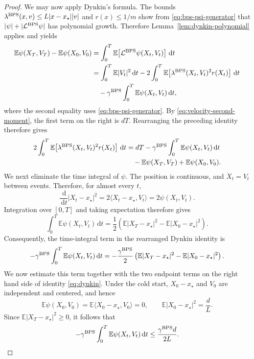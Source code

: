 \documentclass{amsart}
\theoremstyle{plain}
\theoremstyle{definition}
\theoremstyle{remark}
\newcommand{\ud}{\,\mathrm{d}}
\newcommand{\EE}{\mathbb{E}}
\newcommand{\abs}[1]{\lvert#1\rvert}
\newcommand{\E}{\EE}
\newcommand{\1}{\mathbf 1}
\newcommand{\dd}{\ud}
\newcommand{\ip}[2]{\langle #1,#2\rangle}
\newcommand{\bps}{{\rm BPS}}
\begin{document}
\begin{proof}
We may now apply Dynkin's formula.  The bounds
$\lambda^{\bps}(x,v)\le L\abs{x-x_\star}\abs v$ and
$r(x)\le1/m$ show from \eqref{eq:bps-psi-generator} that
$\abs\psi+\abs{\mathcal L^{\bps}\psi}$ has polynomial growth.  Therefore
Lemma~\ref{lem:dynkin-polynomial} applies and yields
\[
\begin{aligned}
        \E\psi(X_T,V_T)-\E\psi(X_0,V_0)
        & =\int_0^T
          \E\!\left[\mathcal L^{\bps}\psi(X_t,V_t)\right]\dd t \\
        &=\int_0^T\E\abs{V_t}^2\dd t
          -2\int_0^T\E\!\left[
            \lambda^{\bps}(X_t,V_t)^2r(X_t)
          \right]\dd t\\
        &\quad-\gamma^{\bps}
          \int_0^T\E\psi(X_t,V_t)\dd t,
\end{aligned}
\]
where the second equality uses  \eqref{eq:bps-psi-generator}.
By \eqref{eq:velocity-second-moment}, the first term on the right is $dT$.
Rearranging the preceding identity therefore gives
\begin{equation}\label{eq:dynkin}
\begin{aligned}
        2\int_0^T\E\!\left[
          \lambda^{\bps}(X_t,V_t)^2r(X_t)
        \right]\dd t
        &=dT-\gamma^{\bps}\int_0^T\E\psi(X_t,V_t)\dd t\\
        &\quad-\E\psi(X_T,V_T)+\E\psi(X_0,V_0).
\end{aligned}
\end{equation}
We next eliminate the time integral of $\psi$.  The position is continuous,
and $\dot X_t=V_t$ between events.  Therefore, for almost every $t$,
\[
        \frac{\dd}{\dd t}\abs{X_t-x_\star}^2
        =2\ip{X_t-x_\star}{V_t}
        =2\psi(X_t,V_t).
\]
Integration over $[0,T]$ and taking expectation therefore gives 
\[
        \int_0^T\E\psi(X_t,V_t)\dd t
        =\frac12\left(
          \E\abs{X_T-x_\star}^2-\E\abs{X_0-x_\star}^2
        \right).
\]
Consequently, the time-integral term in the rearranged Dynkin identity is
\[
        -\gamma^{\bps}\int_0^T\E\psi(X_t,V_t)\dd t
        =-\frac{\gamma^{\bps}}2
          \left(\E\abs{X_T-x_\star}^2-\E\abs{X_0-x_\star}^2\right).
\]
We now estimate this term together with the two endpoint terms on the right hand side of 
identity \eqref{eq:dynkin}. Under the cold start, $X_0-x_\star$ and $V_0$ are independent and centered, and hence
\[
        \E\psi(X_0,V_0)
        =\E\ip{X_0-x_\star}{V_0}=0,
        \qquad
        \E\abs{X_0-x_\star}^2=\frac dL.
\]
Since $\E\abs{X_T-x_\star}^2\ge0$, it follows that
\[
        -\gamma^{\bps}\int_0^T\E\psi(X_t,V_t)\dd t
        \le\frac{\gamma^{\bps}d}{2L}.
\]
\end{proof}
\end{document}
